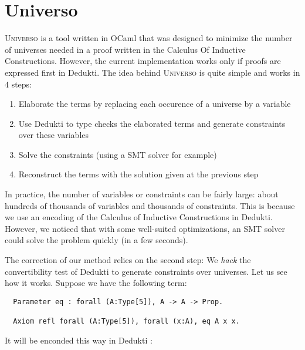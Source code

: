 \documentclass{article}
\newcommand{\universo}{\textsc{Universo}}
\begin{document}

\section{Universo}

\universo{} is a tool written in OCaml that was designed to minimize the number of universes needed in a proof written in the Calculus Of Inductive Constructions. However, the current implementation works only if proofs are expressed first in Dedukti. The idea behind \universo{} is quite simple and works in \(4\) steps:
\begin{enumerate}
\item Elaborate the terms by replacing each occurence of a universe by a variable
\item Use Dedukti to type checks the elaborated terms and generate constraints over these variables
\item Solve the constraints (using a SMT solver for example)
\item Reconstruct the terms with the solution given at the previous step
\end{enumerate}

In practice, the number of variables or constraints can be fairly large: about hundreds of thousands of variables and thousands of constraints. This is because we use an encoding of the Calculus of Inductive Constructions in Dedukti. However, we noticed that with some well-suited optimizations, an SMT solver could solve the problem quickly (in a few seconds).

The correction of our method relies on the second step: We \textit{hack} the convertibility test of Dedukti to generate constraints over universes. Let us see how it works. Suppose we have the following term:

\begin{verbatim}
  Parameter eq : forall (A:Type[5]), A -> A -> Prop.

  Axiom refl forall (A:Type[5]), forall (x:A), eq A x x.
\end{verbatim}

It will be enconded this way in Dedukti :
\end{document}
